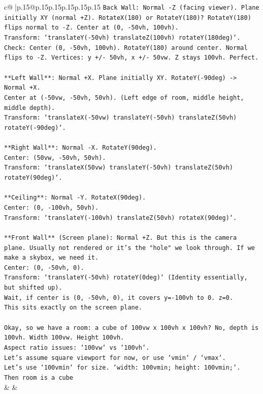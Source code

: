 \documentclass{article}
\begin{document}
{\begin{supertabular}{c@{$\;$}|p{.15\linewidth}@{}p{.15\linewidth}p{.15\linewidth}p{.15\linewidth}p{.15\linewidth}p{.15\linewidth}}
{{{\texttt{Back Wall: Normal {-}Z (facing viewer). Plane initially XY (normal +Z). RotateX(180) or RotateY(180)? RotateY(180) flips normal to {-}Z. Center at (0, {-}50vh, 100vh).} \\
\texttt{Transform: `translateY({-}50vh) translateZ(100vh) rotateY(180deg)`.} \\
\texttt{Check: Center (0, {-}50vh, 100vh). RotateY(180) around center. Normal flips to {-}Z. Vertices: y +/{-} 50vh, x +/{-} 50vw. Z stays 100vh. Perfect.} \\
\\ 
\texttt{**Left Wall**: Normal +X. Plane initially XY. RotateY({-}90deg) {-}> Normal +X.} \\
\texttt{Center at ({-}50vw, {-}50vh, 50vh). (Left edge of room, middle height, middle depth).} \\
\texttt{Transform: `translateX({-}50vw) translateY({-}50vh) translateZ(50vh) rotateY({-}90deg)`.} \\
\\ 
\texttt{**Right Wall**: Normal {-}X. RotateY(90deg).} \\
\texttt{Center: (50vw, {-}50vh, 50vh).} \\
\texttt{Transform: `translateX(50vw) translateY({-}50vh) translateZ(50vh) rotateY(90deg)`.} \\
\\ 
\texttt{**Ceiling**: Normal {-}Y. RotateX(90deg).} \\
\texttt{Center: (0, {-}100vh, 50vh).} \\
\texttt{Transform: `translateY({-}100vh) translateZ(50vh) rotateX(90deg)`.} \\
\\ 
\texttt{**Front Wall** (Screen plane): Normal +Z. But this is the camera plane. Usually not rendered or it's the "hole" we look through. If we make a skybox, we need it.} \\
\texttt{Center: (0, {-}50vh, 0).} \\
\texttt{Transform: `translateY({-}50vh) rotateY(0deg)` (Identity essentially, but shifted up).} \\
\texttt{Wait, if center is (0, {-}50vh, 0), it covers y={-}100vh to 0. z=0.} \\
\texttt{This sits exactly on the screen plane.} \\
\\ 
\texttt{Okay, so we have a room: a cube of 100vw x 100vh x 100vh? No, depth is 100vh. Width 100vw. Height 100vh.} \\
\texttt{Aspect ratio issues: `100vw` vs `100vh`.} \\
\texttt{Let's assume square viewport for now, or use `vmin` / `vmax`.} \\
\texttt{Let's use `100vmin` for size. `width: 100vmin; height: 100vmin;`.} \\
\texttt{Then room is a cube} \\
            }
        }
    }
    & & \\ \\


\end{supertabular}}
\end{document}
